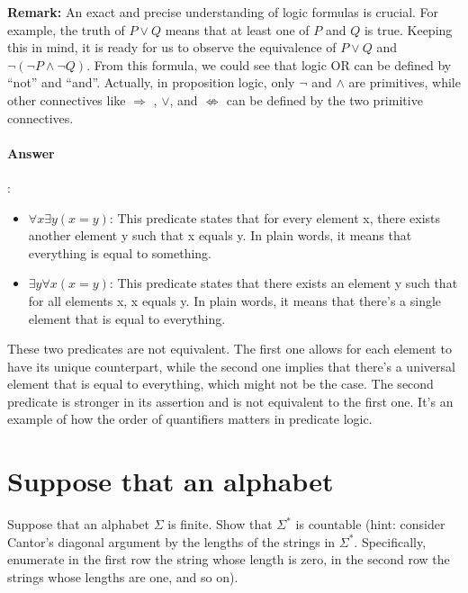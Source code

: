 \documentclass{article}
\begin{document}
\begin{tcolorbox}
  \textbf{Remark:} An exact and precise understanding of logic formulas is crucial. For example, the truth of $P \lor Q$ means that at least one of $P$ and $Q$ is true. Keeping this in mind, it is ready for us to observe the equivalence of $P \lor Q$ and $\lnot (\lnot P \land \lnot Q)$. From this formula, we could see that logic OR can be defined by “not” and “and”. Actually, in proposition logic, only $\lnot$ and $\land$ are primitives, while other connectives like $\Longrightarrow$ , $\lor$, and $\nLeftrightarrow $ can be defined by the two primitive connectives.
\end{tcolorbox}

\paragraph{Answer}:

\begin{itemize}
  \item $\forall x \exists y (x = y)$: This predicate states that for every element x, there exists another element y such that x equals y. In plain words, it means that everything is equal to something.

  \item $\exists y \forall x (x = y)$: This predicate states that there exists an element y such that for all elements x, x equals y. In plain words, it means that there's a single element that is equal to everything.
\end{itemize}

These two predicates are not equivalent. The first one allows for each element to have its unique counterpart, while the second one implies that there's a universal element that is equal to everything, which might not be the case. The second predicate is stronger in its assertion and is not equivalent to the first one. It's an example of how the order of quantifiers matters in predicate logic.

\section{Suppose that an alphabet}

Suppose that an alphabet $\Sigma$ is finite. Show that $\Sigma^*$ is countable (hint: consider Cantor's diagonal argument by the lengths of the strings in $\Sigma^*$. Specifically, enumerate in the first row the string whose length is zero, in the second row the strings whose lengths are one, and so on).
\end{document}
